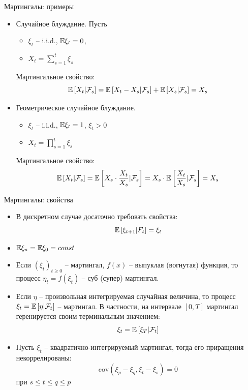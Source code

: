\documentclass{beamer}
\begin{document}
\begin{frame}{Мартингалы: примеры}
    \begin{itemize}
        \item Случайное блуждание. Пусть
        \begin{itemize}
            \item $\xi_t$ -- i.i.d., $\mathbb{E} \xi_t =0$,
            \item $X_t = \sum_{s=1}^{t}\xi_s$
        \end{itemize}
    Мартингальное свойство:
    $$
        \mathbb{E} \left[ X_t | \mathcal{F}_s\right]
        = \mathbb{E} \left[ X_t - X_s | \mathcal{F}_s\right]
        + \mathbb{E} \left[ X_s | \mathcal{F}_s\right] = X_s
    $$
    \item Геометрическое случайное блуждание. 
    \begin{itemize}
        \item $\xi_t$ -- i.i.d., $\mathbb{E} \xi_t = 1$, $\xi_t > 0$
        \item $X_t = \prod_{s=1}^t \xi_s$
    \end{itemize}
    Мартингальное свойство:
    $$
        \mathbb{E} \left[ X_t | \mathcal{F}_s\right]
        = \mathbb{E} \left[ X_s \cdot \dfrac{X_t}{X_s} | \mathcal{F}_s\right]
        = X_s \cdot \mathbb{E} \left[ \dfrac{X_t}{X_s} | \mathcal{F}_s\right] = X_s
    $$
    \end{itemize}
\end{frame}

\begin{frame}{Мартингалы: свойства}
    \begin{itemize}
        \item В дискретном случае досаточно требовать свойства:
        $$
            \mathbb{E} \left[ \xi_{t+1} | F_{t}\right] = \xi_t
        $$
        \item $\mathbb{E} \xi_n = \mathbb{E} \xi_0 = const$
        \item Если $(\xi_t)_{t\geq 0}$ -- мартингал, $f(x)$ -- выпуклая (вогнутая) функция, то процесс $\eta_t = f(\xi_t)$ -- суб (супер) мартингал.
        \item Если $\eta$ -- произвольная интегрируемая случайная величина, то процесс $\xi_t = \mathbb{E} \left[ \eta|\mathcal{F}_t\right]$ -- мартингал. В частности, на интервале $[0, T]$ мартингал геренируется своим терминальным значением:
        $$
            \xi_t = \mathbb{E} \left[ \xi_T | \mathcal{F}_t \right]
        $$
        \item Пусть $\xi_t$ -- квадратично-интегрируемый мартингал, тогда его приращения некоррелированы:
        $$
            \mathrm{cov} (\xi_p - \xi_q, \xi_t - \xi_s) = 0
        $$ при $s \leq t \leq q \leq p$
    \end{itemize} 
\end{frame}
\end{document}

